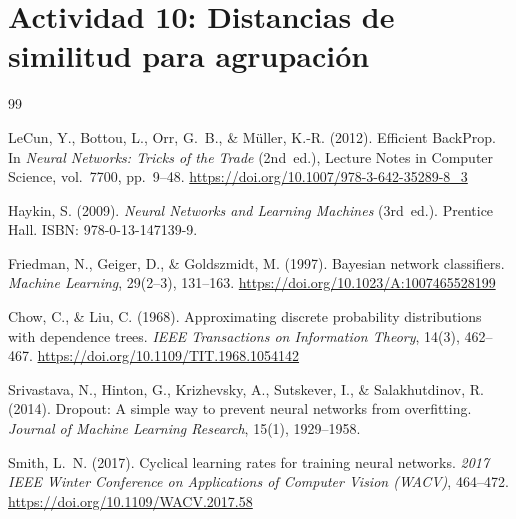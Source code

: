 \documentclass[11pt,a4paper]{article}
\theoremstyle{definition}
\theoremstyle{plain}
\theoremstyle{remark}
\begin{document}
\section{Actividad 10: Distancias de similitud para agrupación}


\clearpage


\begin{thebibliography}{99}


LeCun, Y., Bottou, L., Orr, G.~B., \& M\"uller, K.-R. (2012).
Efficient BackProp.
In \emph{Neural Networks: Tricks of the Trade} (2nd~ed.), Lecture Notes in Computer Science, vol.~7700, pp.~9--48.
\url{https://doi.org/10.1007/978-3-642-35289-8\_3}

Haykin, S. (2009).
\emph{Neural Networks and Learning Machines} (3rd~ed.).
Prentice Hall.
ISBN: 978-0-13-147139-9.

Friedman, N., Geiger, D., \& Goldszmidt, M. (1997).
Bayesian network classifiers.
\emph{Machine Learning}, 29(2--3), 131--163.
\url{https://doi.org/10.1023/A:1007465528199}

Chow, C., \& Liu, C. (1968).
Approximating discrete probability distributions with dependence trees.
\emph{IEEE Transactions on Information Theory}, 14(3), 462--467.
\url{https://doi.org/10.1109/TIT.1968.1054142}

Srivastava, N., Hinton, G., Krizhevsky, A., Sutskever, I., \& Salakhutdinov, R. (2014).
Dropout: A simple way to prevent neural networks from overfitting.
\emph{Journal of Machine Learning Research}, 15(1), 1929--1958.


Smith, L.~N. (2017).
Cyclical learning rates for training neural networks.
\emph{2017 IEEE Winter Conference on Applications of Computer Vision (WACV)}, 464--472.
\url{https://doi.org/10.1109/WACV.2017.58}


\end{thebibliography}
\end{document}
